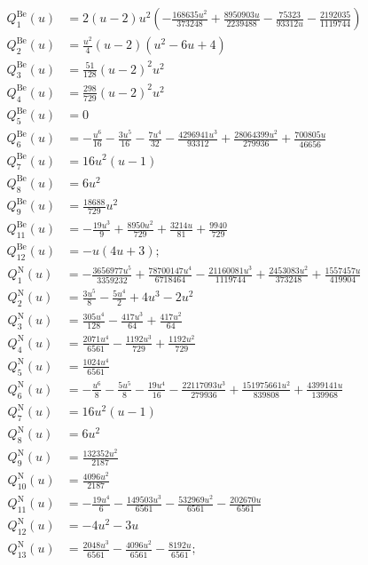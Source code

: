 \begin{subequations}
\begin{align}
Q_1^{\text{Be}}(u)  &=  2 (u-2) u^2 \left(-\frac{168635 u^2}{373248}+\frac{8950903 u}{2239488}-\frac{75323}{93312 u}-\frac{2192035}{1119744}\right)\\
Q_2^{\text{Be}}(u)  &=  \frac{u^2}{4} (u-2) \left(u^2-6 u+4\right)\\
Q_3^{\text{Be}}(u)  &=  \frac{51}{128}(u-2)^2u^2\\
Q_4^{\text{Be}}(u)  &=  \frac{298}{729}(u-2)^2u^2\\
Q_5^{\text{Be}}(u)  &=  0\\
Q_6^{\text{Be}}(u)  &=  -\frac{u^6}{16}-\frac{3 u^5}{16}-\frac{7 u^4}{32}-\frac{4296941 u^3}{93312}+\frac{28064399 u^2}{279936}+\frac{700805 u}{46656}\\
Q_7^{\text{Be}}(u)  &=  16u^2(u-1)\\
Q_8^{\text{Be}}(u)  &=  6u^2\\
Q_9^{\text{Be}}(u)  &=  \frac{18688}{729}u^2\\
Q_{11}^{\text{Be}}(u)  &=  -\frac{19 u^3}{9}+\frac{8950 u^2}{729}+\frac{3214 u}{81}+\frac{9940}{729}\\
Q_{12}^{\text{Be}}(u)  &=  -u\left(4u+3\right);
\end{align}
\end{subequations}
\begin{subequations}
\begin{align}
Q_1^{\text{N}}(u)  &=  -\frac{3656977 u^5}{3359232}+\frac{78700147 u^4}{6718464}-\frac{21160081 u^3}{1119744}+\frac{2453083 u^2}{373248}+\frac{1557457 u}{419904}\\
Q_2^{\text{N}}(u)  &=  \frac{3 u^5}{8}-\frac{5 u^4}{2}+4 u^3-2 u^2\\
Q_3^{\text{N}}(u)  &=  \frac{305 u^4}{128}-\frac{417 u^3}{64}+\frac{417 u^2}{64}\\
Q_4^{\text{N}}(u)  &=  \frac{2071 u^4}{6561}-\frac{1192 u^3}{729}+\frac{1192 u^2}{729}\\
Q_5^{\text{N}}(u)  &=  \frac{1024 u^4}{6561}\\
Q_6^{\text{N}}(u)  &=  -\frac{u^6}{8}-\frac{5 u^5}{8}-\frac{19 u^4}{16}-\frac{22117093 u^3}{279936}+\frac{151975661 u^2}{839808}+\frac{4399141 u}{139968}\\
Q_7^{\text{N}}(u)  &=  16u^2(u-1)\\
Q_8^{\text{N}}(u)  &=  6u^2\\
Q_9^{\text{N}}(u)  &= \frac{132352 u^2}{2187}\\
Q_{10}^{\text{N}}(u)  &=\frac{4096 u^2}{2187} \\
Q_{11}^{\text{N}}(u)  &=  -\frac{19 u^4}{6}-\frac{149503 u^3}{6561}-\frac{532969 u^2}{6561}-\frac{202670 u}{6561}\\
Q_{12}^{\text{N}}(u)  &=  -4 u^2-3 u\\
Q_{13}^{\text{N}}(u)  &= \frac{2048 u^3}{6561}-\frac{4096 u^2}{6561}-\frac{8192 u}{6561};
\end{align}
\end{subequations}
